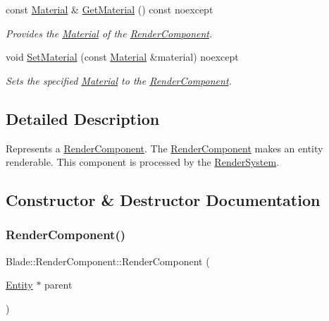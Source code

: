 \begin{DoxyCompactItemize}
const \hyperlink{struct_blade_1_1_material}{Material} \& \hyperlink{class_blade_1_1_render_component_a8d8d98cd4f9e559160fcb9ebcaf07fbb}{Get\+Material} () const noexcept
\begin{DoxyCompactList}\small\item\em Provides the \hyperlink{struct_blade_1_1_material}{Material} of the \hyperlink{class_blade_1_1_render_component}{Render\+Component}. \end{DoxyCompactList}\item 
void \hyperlink{class_blade_1_1_render_component_ae985d0c5ac2ff9eb158683e72203ddf1}{Set\+Material} (const \hyperlink{struct_blade_1_1_material}{Material} \&material) noexcept
\begin{DoxyCompactList}\small\item\em Sets the specified \hyperlink{struct_blade_1_1_material}{Material} to the \hyperlink{class_blade_1_1_render_component}{Render\+Component}. \end{DoxyCompactList}\end{DoxyCompactItemize}


\subsection{Detailed Description}
Represents a \hyperlink{class_blade_1_1_render_component}{Render\+Component}. The \hyperlink{class_blade_1_1_render_component}{Render\+Component} makes an entity renderable. This component is processed by the \hyperlink{class_blade_1_1_render_system}{Render\+System}. 

\subsection{Constructor \& Destructor Documentation}
\mbox{\label{class_blade_1_1_render_component_a7bd09f012ebce3b94c882ed4afd5698f}} 
\subsubsection{\texorpdfstring{Render\+Component()}{RenderComponent()}}
{\footnotesize\ttfamily Blade\+::\+Render\+Component\+::\+Render\+Component (\begin{DoxyParamCaption}\item[{\hyperlink{class_blade_1_1_entity}{Entity} $\ast$}]{parent }\end{DoxyParamCaption})\hspace{0.3cm}{\ttfamily [explicit]}}



